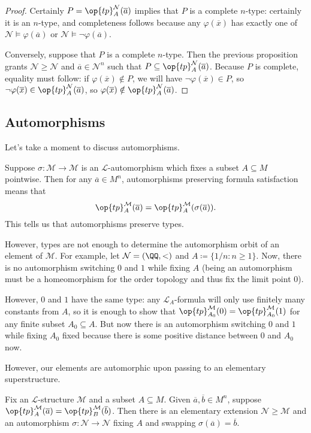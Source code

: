\documentclass[../notes.tex]{subfiles}
\begin{document}
\begin{proof}
	Certainly $P=\op{tp}_{A}^{\mathcal N}(\overline a)$ implies that $P$ is a complete $n$-type: certainly it is an $n$-type, and completeness follows because any $\varphi(\overline x)$ has exactly one of $\mathcal N\models\varphi(\overline a)$ or $\mathcal N\models\lnot\varphi(\overline a)$.

	Conversely, suppose that $P$ is a complete $n$-type. Then the previous proposition grants $\mathcal N\ge\mathcal N$ and $\overline a\in\mathcal N^n$ such that $P\subseteq\op{tp}^{\mathcal N}_A(\overline a)$. Because $P$ is complete, equality must follow: if $\varphi(\overline x)\notin P$, we will have $\lnot\varphi(\overline x)\in P$, so $\lnot\varphi(\overline x)\in\op{tp}^{\mathcal N}_A(\overline a)$, so $\varphi(\overline x)\notin\op{tp}^{\mathcal N}_A(\overline a)$.
\end{proof}

\subsection{Automorphisms}
Let's take a moment to discuss automorphisms.
\begin{remark}
	Suppose $\sigma\colon\mathcal M\to\mathcal M$ is an $\mathcal L$-automorphism which fixes a subset $A\subseteq M$ pointwise. Then for any $\overline a\in M^n$, automorphisms preserving formula satisfaction means that
	\[\op{tp}^{\mathcal M}_A(\overline a)=\op{tp}^{\mathcal M}_A(\sigma(\overline a)).\]
	This tells us that automorphisms preserve types.
\end{remark}
\begin{example}
	However, types are not enough to determine the automorphism orbit of an element of $\mathcal M$. For example, let $\mathcal N=(\QQ,<)$ and $A\coloneqq\{1/n:n\ge1\}$. Now, there is no automorphism switching $0$ and $1$ while fixing $A$ (being an automorphism must be a homeomorphism for the order topology and thus fix the limit point $0$).
	
	However, $0$ and $1$ have the same type: any $\mathcal L_A$-formula will only use finitely many constants from $A$, so it is enough to show that $\op{tp}^{\mathcal M}_{A_0}(0)=\op{tp}^{\mathcal M}_{A_0}(1)$ for any finite subset $A_0\subseteq A$. But now there is an automorphism switching $0$ and $1$ while fixing $A_0$ fixed because there is some positive distance between $0$ and $A_0$ now.
\end{example}
However, our elements are automorphic upon passing to an elementary superstructure.
\begin{proposition}
	Fix an $\mathcal L$-structure $\mathcal M$ and a subset $A\subseteq M$. Given $\overline a,\overline b\in M^n$, suppose $\op{tp}^{\mathcal M}_A(\overline a)=\op{tp}^{\mathcal M}_B(\overline b)$. Then there is an elementary extension $\mathcal N\ge\mathcal M$ and an automorphism $\sigma\colon\mathcal N\to\mathcal N$ fixing $A$ and swapping $\sigma(\overline a)=\overline b$.
\end{proposition}
\end{document}
